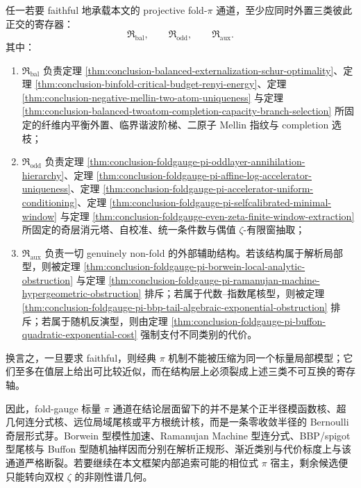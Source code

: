 \begin{conjecture}\label{conj:conclusion-foldgauge-pi-three-register-lower-bound}
任一若要 faithful 地承载本文的 projective fold-\(\pi\) 通道，至少应同时外置三类彼此正交的寄存器：
\[
\mathfrak R_{\mathrm{bal}},
\qquad
\mathfrak R_{\mathrm{odd}},
\qquad
\mathfrak R_{\mathrm{aux}}.
\]
其中：
\begin{enumerate}
  \item \(\mathfrak R_{\mathrm{bal}}\) 负责定理 \ref{thm:conclusion-balanced-externalization-schur-optimality}、定理 \ref{thm:conclusion-binfold-critical-budget-renyi-energy}、定理 \ref{thm:conclusion-negative-mellin-two-atom-uniqueness} 与定理 \ref{thm:conclusion-balanced-twoatom-completion-capacity-branch-selection} 所固定的纤维内平衡外置、临界谐波阶梯、二原子 Mellin 指纹与 completion 选枝；
  \item \(\mathfrak R_{\mathrm{odd}}\) 负责定理 \ref{thm:conclusion-foldgauge-pi-oddlayer-annihilation-hierarchy}、定理 \ref{thm:conclusion-foldgauge-pi-affine-log-accelerator-uniqueness}、定理 \ref{thm:conclusion-foldgauge-pi-accelerator-uniform-conditioning}、定理 \ref{thm:conclusion-foldgauge-pi-selfcalibrated-minimal-window} 与定理 \ref{thm:conclusion-foldgauge-even-zeta-finite-window-extraction} 所固定的奇层消元塔、自校准、统一条件数与偶值 \(\zeta\)-有限窗抽取；
  \item \(\mathfrak R_{\mathrm{aux}}\) 负责一切 genuinely non-fold 的外部辅助结构。若该结构属于解析局部型，则被定理 \ref{thm:conclusion-foldgauge-pi-borwein-local-analytic-obstruction} 与定理 \ref{thm:conclusion-foldgauge-pi-ramanujan-machine-hypergeometric-obstruction} 排斥；若属于代数--指数尾核型，则被定理 \ref{thm:conclusion-foldgauge-pi-bbp-tail-algebraic-exponential-obstruction} 排斥；若属于随机反演型，则由定理 \ref{thm:conclusion-foldgauge-pi-buffon-quadratic-exponential-cost} 强制支付不同类别的代价。
\end{enumerate}
换言之，一旦要求 faithful，则经典 \(\pi\) 机制不能被压缩为同一个标量局部模型；它们至多在值层上给出可比较近似，而在结构层上必须裂成上述三类不可互换的寄存轴。
\end{conjecture}

\noindent
因此，fold-gauge 标量 \(\pi\) 通道在结论层面留下的并不是某个正半径模函数核、超几何连分式核、远位局域尾核或平方根统计核，而是一条零收敛半径的 Bernoulli 奇层形式芽。Borwein 型模性加速、Ramanujan Machine 型连分式、BBP/spigot 型尾核与 Buffon 型随机抽样因而分别在解析正规形、渐近类别与代价标度上与该通道严格断裂。若要继续在本文框架内部追索可能的相位式 \(\pi\) 宿主，剩余候选便只能转向双权 \(\zeta\) 的非刚性谱几何。

\endinput
